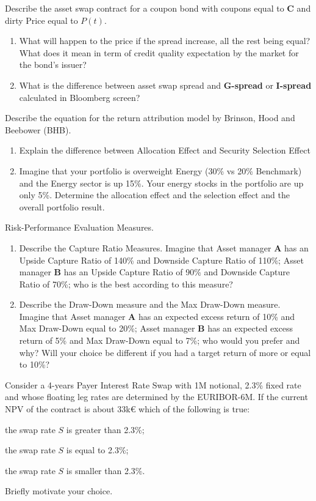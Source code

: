 \documentclass[12pt,a4paper]{exam}
\begin{document}
\begin{questions}

\question Describe the asset swap contract for a coupon bond with coupons equal to \textbf{C} and dirty Price equal to $P(t)$.	
\begin{enumerate}
\item What will happen to the price if the spread increase, all the rest being equal? What does it mean in term of credit quality expectation by the market for the bond's issuer?
\item What is the difference between asset swap spread and \textbf{G-spread} or \textbf{I-spread} calculated in Bloomberg screen?
\end{enumerate}
\fillwithlines{3cm}

\question Describe the equation for the return attribution model by Brinson, Hood and Beebower (BHB). 
\begin{enumerate}[label=(\alph*),font=\itshape]
\item Explain the difference between Allocation Effect and Security Selection Effect 
\item Imagine that your portfolio is overweight Energy (30\% vs 20\% Benchmark) and the Energy sector is up 15\%. Your energy stocks in the portfolio are up only 5\%. Determine the allocation effect and the selection effect and the overall portfolio result.
\end{enumerate}
\fillwithlines{3cm}

\question Risk-Performance Evaluation Measures.
\begin{enumerate}
\item Describe the Capture Ratio Measures. Imagine that Asset manager \textbf{A} has an Upside Capture Ratio of 140\% and Downside Capture Ratio of 110\%; Asset manager \textbf{B} has an Upside Capture Ratio of 90\% and Downside Capture Ratio of 70\%; who is the best according to this measure?
\item Describe the Draw-Down measure and the Max Draw-Down measure. Imagine that Asset manager \textbf{A} has an expected excess return of 10\% and Max Draw-Down equal to 20\%; Asset manager \textbf{B} has an expected excess return of 5\% and Max Draw-Down equal to 7\%; who would you prefer and why? Will your choice be different if you had a target return of more or equal to 10\%?

\end{enumerate}
\fillwithlines{3cm}


\question
Consider a 4-years Payer Interest Rate Swap with 1M notional, 2.3\% fixed rate and whose floating leg rates are determined by the EURIBOR-6M. 
If the current NPV of the contract is about 33k€ which of the following is true:
\begin{checkboxes}
\item the swap rate $S$ is greater than 2.3\%;
\item the swap rate $S$ is equal to 2.3\%;
\item the swap rate $S$ is smaller than 2.3\%.
\end{checkboxes}
Briefly motivate your choice.


\end{questions}
\end{document}
